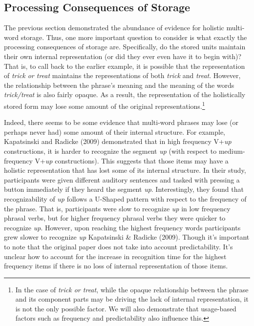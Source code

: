 \documentclass[
  man,floatsintext]{apa6}
\begin{document}
\subsection{Processing Consequences of Storage}\label{processing-consequences-of-storage}

The previous section demonstrated the abundance of evidence for holistic multi-word storage. Thus, one more important question to consider is what exactly the processing consequences of storage are. Specifically, do the stored units maintain their own internal representation (or did they ever even have it to begin with)? That is, to call back to the earlier example, it is possible that the representation of \emph{trick or treat} maintains the representations of both \emph{trick} and \emph{treat}. However, the relationship between the phrase's meaning and the meaning of the words \emph{trick/treat} is also fairly opaque. As a result, the representation of the holistically stored form may lose some amount of the original representations.\footnote{In the case of \emph{trick or treat}, while the opaque relationship between the phrase and its component parts may be driving the lack of internal representation, it is not the only possible factor. We will also demonstrate that usage-based factors such as frequency and predictability also influence this.}

Indeed, there seems to be some evidence that multi-word phrases may lose (or perhaps never had) some amount of their internal structure. For example, Kapatsinski and Radicke (2009) demonstrated that in high frequency V+\emph{up} constructions, it is harder to recognize the segment \emph{up} (with respect to medium-frequency V+\emph{up} constructions). This suggests that those items may have a holistic representation that has lost some of its internal structure. In their study, participants were given different auditory sentences and tasked with pressing a button immediately if they heard the segment \emph{up}. Interestingly, they found that recognizability of \emph{up} follows a U-Shaped pattern with respect to the frequency of the phrase. That is, participants were slow to recognize \emph{up} in low frequency phrasal verbs, but for higher frequency phrasal verbs they were quicker to recognize \emph{up}. However, upon reaching the highest frequency words participants grew slower to recognize \emph{up} Kapatsinski \& Radicke (2009). Though it's important to note that the original paper does not take into account predictability. It's unclear how to account for the increase in recognition time for the highest frequency items if there is no loss of internal representation of those items.
\end{document}
